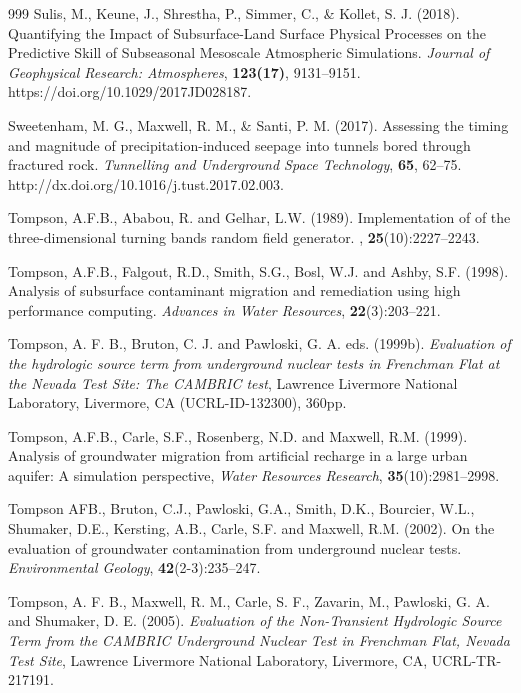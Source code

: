 \begin{thebibliography}{999}
Sulis, M., Keune, J., Shrestha, P., Simmer, C., \& Kollet, S. J. (2018). Quantifying the Impact of Subsurface-Land Surface Physical Processes on the Predictive Skill of Subseasonal Mesoscale Atmospheric Simulations. {\em Journal of Geophysical Research: Atmospheres}, {\bf 123(17)}, 9131–9151. https://doi.org/10.1029/2017JD028187.

Sweetenham, M. G., Maxwell, R. M., \& Santi, P. M. (2017). Assessing the timing and magnitude of precipitation-induced seepage into tunnels bored through fractured rock. {\em Tunnelling and Underground Space Technology}, {\bf 65}, 62–75. http://dx.doi.org/10.1016/j.tust.2017.02.003.

Tompson, A.F.B., Ababou, R. and Gelhar, L.W. (1989).
\newblock Implementation of of the three-dimensional turning bands random field
  generator.
, {\bf 25}(10):2227--2243.

  Tompson, A.F.B., Falgout, R.D., Smith, S.G., Bosl, W.J. and
Ashby, S.F. (1998). Analysis of subsurface contaminant migration and
remediation using high performance computing. {\em Advances in Water
Resources}, { \bf 22}(3):203--221.

Tompson, A. F. B., Bruton, C. J. and Pawloski,  G. A. eds. (1999b). {\em Evaluation of the hydrologic source term from underground nuclear tests in Frenchman Flat at the Nevada Test Site: The CAMBRIC test}, Lawrence Livermore National Laboratory, Livermore, CA (UCRL-ID-132300), 360pp. 

  Tompson, A.F.B., Carle, S.F., Rosenberg, N.D. and Maxwell, R.M. 
 (1999). Analysis of groundwater migration from artificial recharge in a large
 urban aquifer: A simulation perspective, {\em Water Resources
Research}, {\bf 35}(10):2981--2998.

Tompson AFB., Bruton, C.J., Pawloski, G.A., Smith, D.K., Bourcier, W.L., Shumaker, D.E., Kersting, A.B., Carle, S.F. and Maxwell, R.M. (2002). On the evaluation of groundwater contamination from underground nuclear tests.  {\em Environmental Geology}, {\bf 42}(2-3):235--247.

Tompson, A. F. B., Maxwell, R. M., Carle, S. F., Zavarin, M., Pawloski, G. A. and Shumaker, D. E. (2005). {\em Evaluation of the Non-Transient Hydrologic Source Term from the CAMBRIC Underground Nuclear Test in Frenchman Flat, Nevada Test Site}, Lawrence Livermore National Laboratory, Livermore, CA, UCRL-TR-217191.


\end{thebibliography}
